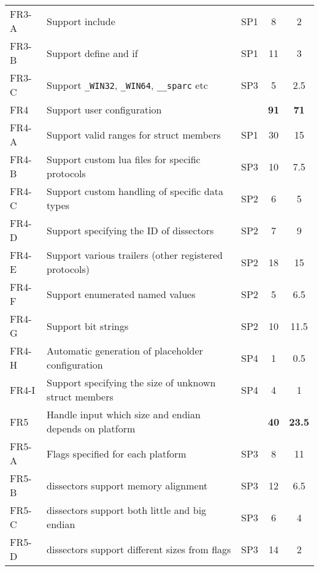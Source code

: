 \begin{table}[htbp]
\begin{tabularx}{\textwidth}{l X c c c}
	FR3-A & Support \gls{include} & SP1 & 8 & 2 \\
	FR3-B & Support \gls{define} and \gls{if} & SP1 & 11 & 3 \\
	FR3-C & Support \verb+_WIN32+, \verb+_WIN64+, \verb+__sparc+ etc & SP3 & 5 & 2.5 \\
	\addlinespace
	FR4 & Support user configuration & & \textbf{91} & \textbf{71}\\
	FR4-A & Support valid ranges for \gls{struct} \glspl{member} & SP1 & 30 & 15 \\
	FR4-B & Support custom \Gls{lua} files for specific protocols & SP3 & 10 & 7.5 \\
	FR4-C & Support custom handling of specific data types & SP2 & 6 & 5 \\
	FR4-D & Support specifying the ID of \glspl{dissector} & SP2 & 7 & 9 \\
	FR4-E & Support various \gls{trailers} (other registered protocols) & SP2 & 18 & 15 \\
	FR4-F & Support \glspl{enumerated named value} & SP2 & 5 & 6.5 \\
	FR4-G & Support bit strings & SP2 & 10 & 11.5 \\
	FR4-H & Automatic generation of placeholder configuration & SP4 & 1 & 0.5\\
	FR4-I & Support specifying the size of unknown struct members & SP4 & 4 & 1\\
	\addlinespace
	FR5 & Handle input which size and \gls{endian} depends on platform & & \textbf{40} & \textbf{23.5} \\
	FR5-A & Flags specified for each platform & SP3 & 8 & 11 \\
	FR5-B & \Glspl{dissector} support memory alignment & SP3 & 12 & 6.5 \\
	FR5-C & \Glspl{dissector} support both little and big \gls{endian} & SP3 & 6 & 4 \\
	FR5-D & \Glspl{dissector} support different sizes from flags & SP3 & 14 & 2 \\	
    \bottomrule
\end{tabularx}
\end{table}	
	
